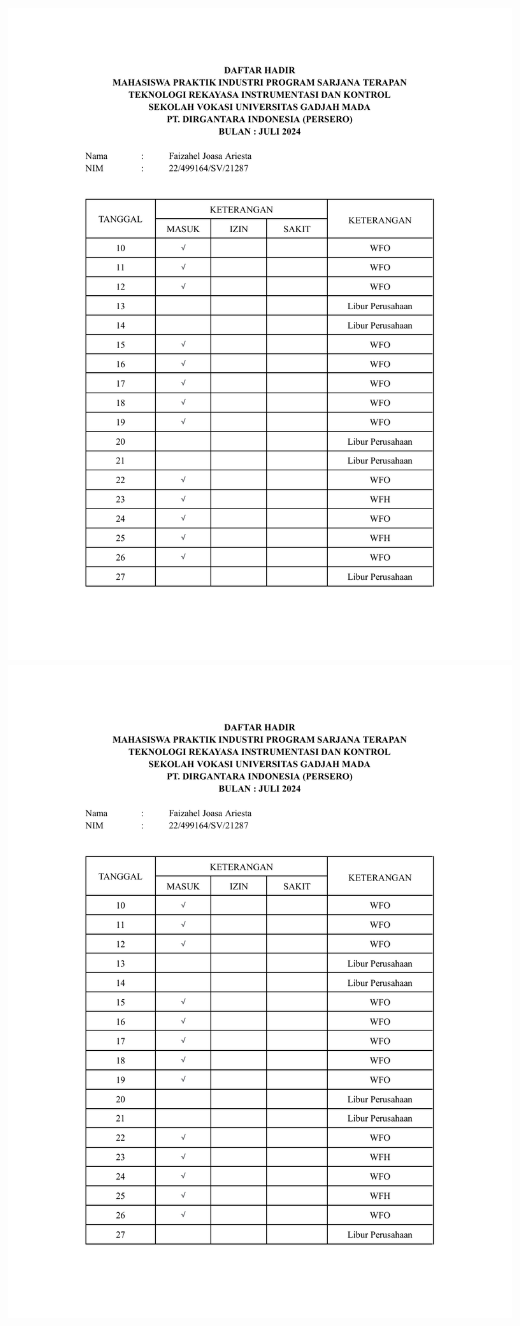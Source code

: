 \includegraphics[scale=0.7,page=2]{dokumen/daftarhadir.pdf}
\newpage
\includegraphics[scale=0.7,page=3]{dokumen/daftarhadir.pdf}
